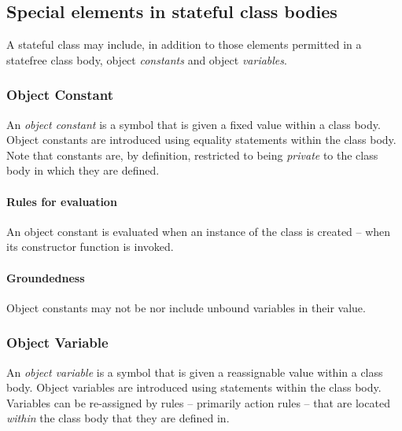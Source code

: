 \subsection{Special elements in stateful class bodies}
A stateful class may include, in addition to those elements permitted in a statefree class body, object \emph{constants} and object \emph{variables}.

\subsubsection{Object Constant}
\label{lo:constant}
An \emph{object constant} is a symbol that is given a fixed value within a class body. Object constants are introduced using equality statements within the class body. Note that constants are, by definition, restricted to being \emph{private} to the class body in which they are defined.

\paragraph{Rules for evaluation}
An object constant is evaluated when an instance of the class is created -- when its constructor function is invoked.

\paragraph{Groundedness}
Object constants may not be nor include unbound variables in their value. 

\subsubsection{Object Variable}
\label{lo:variable}
An \emph{object variable} is a symbol that is given a reassignable value within a class body. Object variables are introduced using \q{:=} statements within the class body. Variables can be re-assigned by rules -- primarily action rules -- that are located \emph{within} the class body that they are defined in. 

